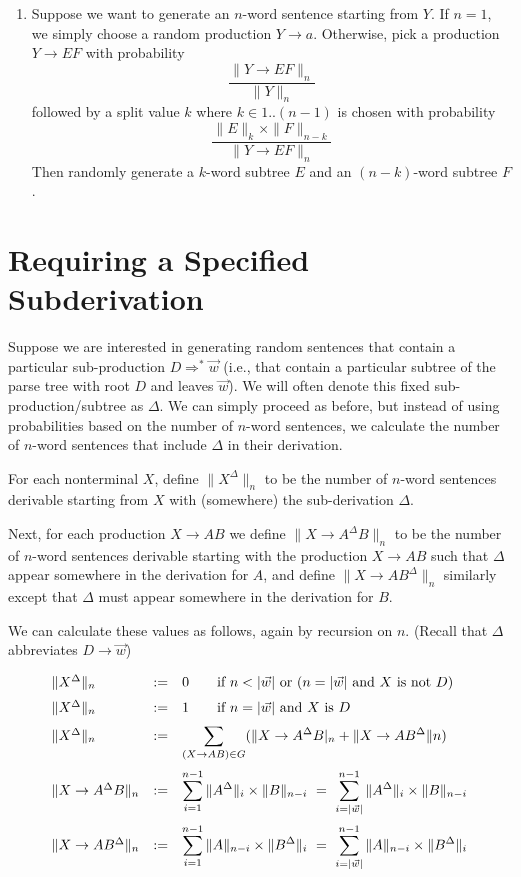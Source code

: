 \documentclass[10pt]{article}
\begin{document}
\begin{enumerate}
    \item Suppose we want to generate an $n$-word sentence starting from $Y$.
    If $n = 1$, we simply choose a random production $Y \to a$. Otherwise,
    pick a production $Y\to EF$ with probability
    \[\frac{\|Y \to EF\|_n}{\|Y\|_n} \]
    followed by a split value $k$ where $k\in{1..(n-1)}$ is chosen with probability
    \[
      \frac{\|E\|_k\times\|F\|_{n{-}k}}{\|Y\to EF\|_n}
    \]
    Then randomly generate a $k$-word subtree $E$ and an $(n{-}k)$-word subtree $F$.
\end{enumerate}

\section{Requiring a Specified Subderivation}

Suppose we are interested in generating random sentences that contain a particular sub-production $D \Rightarrow^* \vec{w}$ (i.e., that contain a particular subtree of the parse tree with root $D$ and leaves $\vec{w}$). We will often denote this fixed sub-production/subtree as $\Delta$.
We can simply proceed as before, but instead of using probabilities based on  the number of $n$-word sentences, we calculate the number of $n$-word sentences that include $\Delta$ in their derivation.

For each nonterminal $X$, define $\|X^\Delta\|_n$ to be the number of $n$-word sentences derivable starting from $X$ with (somewhere) the sub-derivation $\Delta$.

Next, for each production $X\to AB$ we define $\|X\to A^\Delta B\|_n$ to be the number of $n$-word sentences derivable starting with the production $X\to AB$ such that $\Delta$ appear somewhere in the derivation for $A$, and define
$\|X\to AB^\Delta\|_n$ similarly except that $\Delta$ must appear somewhere in the derivation for $B$.

We can calculate these values as follows, again by recursion on $n$. (Recall that $\Delta$ abbreviates $D\to \vec{w}$)

\[
    \begin{array}{lcl}
    \|X^\Delta\|_n &:=&0 \qquad \mbox{if $n < |\vec{w}|$ or ($n = |\vec{w}|$ and $X$ is not $D$)}\\
    \noalign{\medskip}
    \|X^\Delta\|_n &:=& 1 \qquad \mbox{if $n = |\vec{w}|$ and $X$ is $D$}\\
    \noalign{\medskip}
    \|X^\Delta\|_n &:=& \displaystyle\sum_{(X{\to}AB)\in G} (\|X\to A^\Delta B|_n + \|X\to AB^\Delta\|n)\\
    \noalign{\medskip}
    \|X\to A^\Delta B\|_n & := & \displaystyle\sum_{i=1}^{n-1}\|A^\Delta\|_i\times\|B\|_{n-i} \ =\  \sum_{i=|\vec{w}|}^{n-1}\|A^\Delta\|_i\times\|B\|_{n-i}\\
    \noalign{\medskip}
    \|X\to AB^\Delta\|_n & := & \displaystyle\sum_{i=1}^{n-1}\|A\|_{n-i}\times\|B^\Delta\|_{i} \ = \ \displaystyle\sum_{i=|\vec{w}|}^{n-1}\|A\|_{n-i}\times\|B^\Delta\|_{i}\\
    \end{array}
\]
\end{document}
